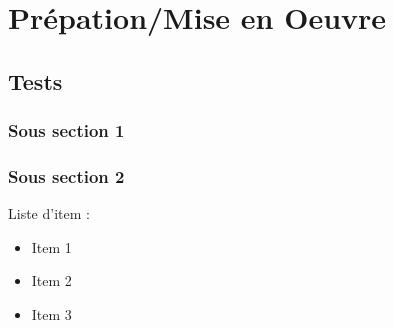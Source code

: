 \chapter{Prépation/Mise en Oeuvre}

\section{Tests}

\subsection{Sous section 1}

\subsection{Sous section 2}

Liste d'item :
\begin{itemize}
\item Item 1
\item Item 2
\item Item 3
\end{itemize}

